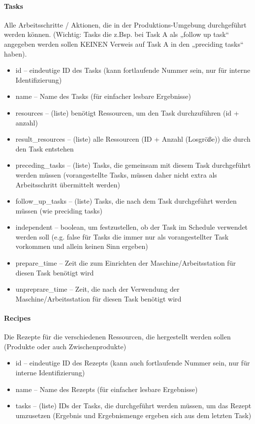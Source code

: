 \documentclass[a4paper,12pt,twoside]{scrreprt}
\begin{document}
\paragraph*{Tasks}
Alle Arbeitsschritte / Aktionen, die in der Produktions-Umgebung durchgeführt werden können.
(Wichtig: Tasks die z.Bsp. bei Task A als „follow up task“ angegeben werden sollen KEINEN Verweis auf Task A in den „preciding tasks“ haben).
\begin{itemize}
	\item id – eindeutige ID des Tasks (kann fortlaufende Nummer sein, nur für interne Identifizierung)
	\item name – Name des Tasks (für einfacher lesbare Ergebnisse)
	\item resources – (liste) benötigt Ressourcen, um den Task durchzuführen (id + anzahl)
	\item result\_resources – (liste) alle Ressourcen (ID + Anzahl (Losgröße)) die durch den Task entstehen
	\item preceding\_tasks – (liste) Tasks, die gemeinsam mit diesem Task durchgeführt werden müssen (vorangestellte Tasks, müssen daher nicht extra als Arbeitsschritt übermittelt werden)
	\item follow\_up\_tasks – (liste) Tasks, die nach dem Task durchgeführt werden müssen (wie preciding tasks)
	\item independent – boolean, um festzustellen, ob der Task im Schedule verwendet werden soll (e.g. false für Tasks die immer nur als vorangestellter Task vorkommen und allein keinen Sinn ergeben)
	\item prepare\_time – Zeit die zum Einrichten der Maschine/Arbeitsstation für diesen Task benötigt wird
	\item unpreprare\_time – Zeit, die nach der Verwendung der Maschine/Arbeitsstation für diesen Task benötigt wird
\end{itemize}
\paragraph*{Recipes}
Die Rezepte für die verschiedenen Ressourcen, die hergestellt werden sollen (Produkte oder auch Zwischenprodukte)
\begin{itemize}
	\item id – eindeutige ID des Rezepts (kann auch fortlaufende Nummer sein, nur für interne Identifizierung)
	\item name – Name des Rezepts (für einfacher lesbare Ergebnisse)
	\item tasks – (liste) IDs der Tasks, die durchgeführt werden müssen, um das Rezept umzusetzen (Ergebnis und Ergebnismenge ergeben sich aus dem letzten Task)
\end{itemize}
\end{document}
